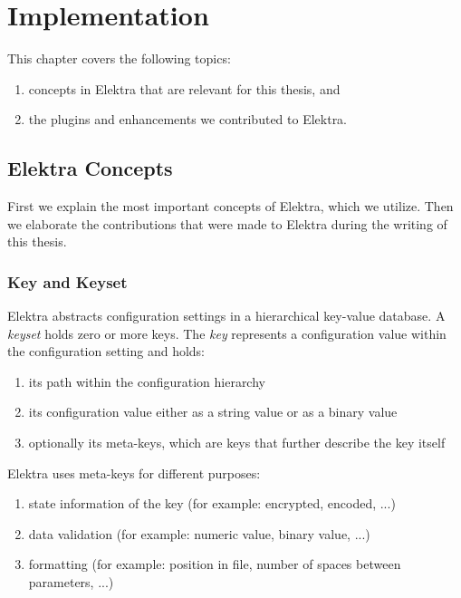 \chapter{Implementation}

This chapter covers the following topics:
\begin{enumerate}
\item concepts in Elektra that are relevant for this thesis, and
\item the plugins and enhancements we contributed to Elektra.
\end{enumerate}


\section{Elektra Concepts}\label{elektra-plugins}

First we explain the most important concepts of Elektra, which we utilize.
Then we elaborate the contributions that were made to Elektra during the writing of this thesis.

\subsection{Key and Keyset}

Elektra abstracts configuration settings in a hierarchical key-value database.
A \emph{keyset} holds zero or more keys.
The \emph{key} represents a configuration value within the configuration setting and holds:
\begin{enumerate}
\item its path within the configuration hierarchy
\item its configuration value either as a string value or as a binary value
\item optionally its meta-keys, which are keys that further describe the key itself
\end{enumerate}

Elektra uses meta-keys for different purposes:

\begin{enumerate}
\item state information of the key (for example: encrypted, encoded, ...)
\item data validation (for example: numeric value, binary value, ...)
\item formatting (for example: position in file, number of spaces between parameters, ...)
\end{enumerate}


